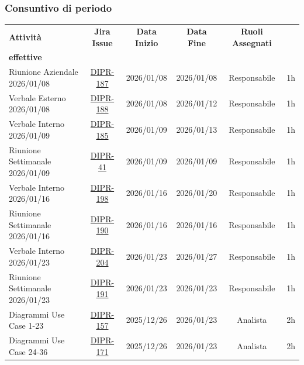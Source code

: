 \documentclass[a4paper,12pt]{article}
\begin{document}
\subsubsection{Consuntivo di periodo}
\small
{}
        \begin{longtable}{|p{4cm}|c|c|c|c|c|}
        \hline
        \rowcolor{zpusgreen!30}
        \textbf{Attività} & \textbf{Jira Issue} & \textbf{Data Inizio} & \textbf{Data Fine} & \textbf{Ruoli Assegnati} & \begin{tabular}[c]{@{}c@{}} \textbf{Ore} \\ \textbf{effettive} \end{tabular} \\
        \hline
        Riunione Aziendale 2026/01/08 & \href{https://7zpus.atlassian.net/browse/DIPR-187}{DIPR-187}& 2026/01/08 & 2026/01/08 & Responsabile & 1h \\
        \hline
        Verbale Esterno 2026/01/08 & \href{https://7zpus.atlassian.net/browse/DIPR-188}{DIPR-188}& 2026/01/08 & 2026/01/12 & Responsabile & 1h \\
        \hline
        Verbale Interno 2026/01/09 & \href{https://7zpus.atlassian.net/browse/DIPR-185}{DIPR-185}& 2026/01/09 & 2026/01/13 & Responsabile & 1h \\
        \hline
        Riunione Settimanale 2026/01/09 & \href{https://7zpus.atlassian.net/browse/DIPR-41}{DIPR-41}& 2026/01/09 & 2026/01/09 & Responsabile & 1h \\
        \hline
        Verbale Interno 2026/01/16 & \href{https://7zpus.atlassian.net/browse/DIPR-198}{DIPR-198}& 2026/01/16 & 2026/01/20 & Responsabile & 1h \\
        \hline
        Riunione Settimanale 2026/01/16 & \href{https://7zpus.atlassian.net/browse/DIPR-190}{DIPR-190}& 2026/01/16 & 2026/01/16 & Responsabile & 1h \\
        \hline
        Verbale Interno 2026/01/23 & \href{https://7zpus.atlassian.net/browse/DIPR-204}{DIPR-204}& 2026/01/23 & 2026/01/27 & Responsabile & 1h \\
        \hline
        Riunione Settimanale 2026/01/23 & \href{https://7zpus.atlassian.net/browse/DIPR-191}{DIPR-191} & 2026/01/23 & 2026/01/23 & Responsabile & 1h \\
        \hline
        Diagrammi Use Case 1-23 & \href{https://7zpus.atlassian.net/browse/DIPR-157}{DIPR-157} & 2025/12/26 & 2026/01/23 & Analista & 2h \\
        \hline
        Diagrammi Use Case 24-36 & \href{https://7zpus.atlassian.net/browse/DIPR-171}{DIPR-171} & 2025/12/26 & 2026/01/23 & Analista & 2h \\

\end{longtable}
\end{document}
